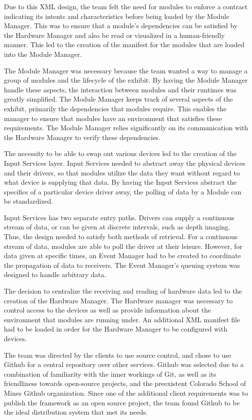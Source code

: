 \documentclass[11pt,letterpaper]{article}
\begin{document}
	Due to this XML design, the team felt the need for modules to enforce a 
	contract indicating its intents and characteristics before being loaded 
	by the Module Manager. This was to ensure that a module's dependencies can 
	be satisfied by the Hardware Manager and also be read or visualized in a 
	human-friendly manner. This led to the creation of the manifest for the 
	modules that are loaded into the Module Manager.

	The Module Manager was necessary because the team wanted a way to manage a 
	group of modules and the lifecycle of the exhibit. By having the Module 
	Manager handle these aspects, the interaction between modules and their 
	runtimes was greatly simplified. The Module Manager keeps track of several 
	aspects of the exhibit, primarily the dependencies that modules require. 
	This enables the manager to ensure that modules have an environment that 
	satisfies these requirements. The Module Manager relies significantly on its 
	communication with the Hardware Manager to verify these dependencies.

	The necessity to be able to swap out various devices led to the creation 
	of the Input Services layer. Input Services needed to abstract away the 
	physical devices and their drivers, so that modules utilize the data they 
	want without regard to what device is supplying that data. By having the 
	Input Services abstract the specifics of a particular device driver away, 
	the polling of data by a Module can be standardized.

	Input Services has two separate entry paths.  Drivers can supply a 
	continuous stream of data, or can be given at discrete intervals, such as 
	depth imaging. Thus, the design needed to satisfy both methods of retrieval. 
	For a continuous stream of data, modules are able to poll the driver at 
	their leisure. However, for data given at specific times, an Event Manager 
	had to be created to coordinate the propagation of data to receivers. The 
	Event Manager's queuing system was designed to handle arbitrary data.

	The decision to centralize the receiving and reading of hardware data led 
	to the creation of the Hardware Manager. The Hardware manager was 
	necessary to control access to the devices as well as provide information 
	about the environment that modules are running under. An additional XML 
	manifest file had to be loaded in order for the Hardware Manager to be 
	configured with devices.

	The team was directed by the clients to use source control, and chose to 
	use Github for a central repository over other services. Github was 
	selected due to a combination of familiarity with the inner workings of Git, 
	as well as its friendliness towards open-source projects, and the 
	preexistent Colorado School of Mines Github organization. Since one of the 
	additional client requirements was to publish the framework as an open 
	source project, the team found Github to be the ideal distribution system 
	that met its needs.
\end{document}

